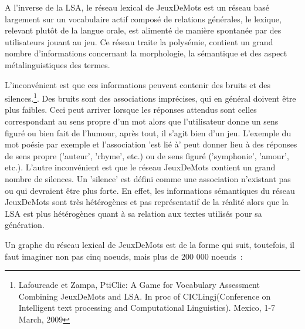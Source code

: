 \documentclass[a4paper,11pt,french]{article}
\begin{document}
A l'inverse de la LSA, le réseau lexical de JeuxDeMots est un réseau basé largement sur un vocabulaire actif composé de relations générales, le lexique, relevant plutôt de la langue orale, est alimenté de manière spontanée par des utilisateurs jouant au jeu. Ce réseau traite la polysémie, contient un grand nombre d'informations concernant la morphologie, la sémantique et des aspect métalinguistiques des termes.

L'inconvénient est que ces informations peuvent contenir des bruits et des silences.\footnote{Lafourcade et Zampa, PtiClic: A Game for Vocabulary Assessment Combining JeuxDeMots and LSA. In proc of CICLingj(Conference on Intelligent text processing and Computational Linguistics). Mexico, 1-7 March, 2009}. Des bruits sont des associations imprécises, qui en général doivent être plus faibles. Ceci peut arriver lorsque les réponses attendus sont celles correspondant au sens propre d'un mot alors que l'utilisateur donne un sens figuré ou bien fait de l'humour, après tout, il s'agit bien d'un jeu. L'exemple du mot poésie par exemple et l'association 'est lié à' peut donner lieu à des réponses de sens propre ('auteur', 'rhyme', etc.) ou de sens figuré ('symphonie', 'amour', etc.). L'autre inconvénient est que le réseau JeuxDeMots contient un grand nombre de silences. Un 'silence' est défini comme une association n'existant pas ou qui devraient être plus forte. En effet, les informations sémantiques du réseau JeuxDeMots sont très hétérogènes et pas représentatif de la réalité alors que la LSA est plus hétérogènes quant à sa relation aux textes utilisés pour sa génération.

Un graphe du réseau lexical de JeuxDeMots est de la forme qui suit, toutefois, il faut imaginer non pas cinq noeuds, mais plus de 200 000 noeuds~:
\end{document}

